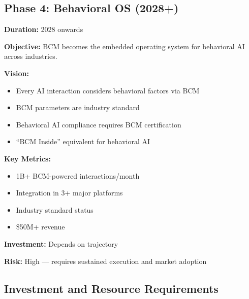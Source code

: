 \subsection{Phase 4: Behavioral OS (2028+)}

\begin{tcolorbox}[colback=green!5!white, colframe=green!75!black,
    title=Phase 4: Behavioral OS]

\textbf{Duration:} 2028 onwards

\textbf{Objective:}
BCM becomes the embedded operating system for behavioral AI across industries.

\textbf{Vision:}
\begin{itemize}[nosep]
\item Every AI interaction considers behavioral factors via BCM
\item BCM parameters are industry standard
\item Behavioral AI compliance requires BCM certification
\item ``BCM Inside'' equivalent for behavioral AI
\end{itemize}

\textbf{Key Metrics:}
\begin{itemize}[nosep]
\item 1B+ BCM-powered interactions/month
\item Integration in 3+ major platforms
\item Industry standard status
\item \$50M+ revenue
\end{itemize}

\textbf{Investment:} Depends on trajectory

\textbf{Risk:} High --- requires sustained execution and market adoption

\end{tcolorbox}


\subsection{Investment and Resource Requirements}

